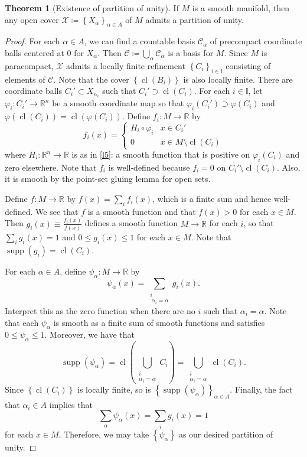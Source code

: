 \documentclass[10pt,letterpaper,cm]{nupset}
\theoremstyle{definition}
\theoremstyle{theorem}
\newtheorem{theorem}[definition]{Theorem}
\theoremstyle{remark}
\newcommand{\R}{\mathbb R}
\newcommand{\1}{\mathbf{1}}
\newcommand{\0}{\vec 0}
\DeclareMathOperator{\supp}{supp}
\DeclareMathOperator{\cl}{cl}
\begin{document}
\begin{theorem}[Existence of partition of unity]
If $M$ is a smooth manifold, then any open cover $\mathcal{X}\coloneqq \left\{X_{\alpha}\right\}_{\alpha \in A}$ of $M$ admits a partition of unity. 
\end{theorem}
\begin{proof}
For each $\alpha \in A$, we can find a countable basis $\mathcal{C}_{\alpha}$ of precompact  coordinate balls centered at $0$ for $X_{\alpha}$. Then $\mathcal{C}\coloneqq \bigcup_{\alpha} \mathcal{C}_{\alpha}$ is a basis for $M$. Since $M$ is paracompact, $\mathcal{X}$ admits a locally finite refinement $\left\{C_i\right\}_{i\in \mathbb{I}}$ consisting of elements of $\mathcal{C}$. Note that the cover $\left\{\cl(B_i)\right\}$ is also locally finite. There are coordinate balls $C_i' \subset X_{\alpha_i}$ such that $ C_i'\supset \cl(C_i)$. For each $i\in \mathbb{I}$, let $\varphi_i : C_i' \to \R^n$ be a smooth coordinate map so that $\varphi_i(C_i') \supset \varphi(C_i)$ and $\varphi(\cl(C_i)) = \cl\left(\varphi(C_i)\right)$. Define $f_i: M \to \R$ by $$f_i(x) = \begin{cases}  H_i \circ \varphi_i &   x\in C_i' \\ 0 & x \in M \setminus \cl(C_i)    \end{cases}      $$ where $H_i: \R^n \to \R$ is as in \cref{l5}: a smooth function that is positive on $\varphi_i(C_i)$ and zero elsewhere. Note that $f_i$ is well-defined because $f_i=0$ on $C_i' \setminus \cl(C_i)$. Also, it is smooth by the point-set gluing lemma for open sets. 

\medskip


Define $f: M \to \R$ by $f(x) = \sum_{i}f_i(x)$, which is a finite sum and hence well-defined. We see that $f$ is a smooth function and that $f(x) >0$ for each $x\in M$. Then $g_i(x) \equiv \frac{f_i(x)}{f(x)}$ defines a smooth function $M \to \R$ for each $i$, so that $\sum_i g_i(x) = 1$ and $0\leq g_i(x) \leq 1$ for each $x\in M$. Note that $\supp(g_i) = \cl(C_i)$. 

\medskip


For each $\alpha \in A$, define $\psi_{\alpha} : M \to \R$ by $$\psi_{\alpha}(x) = \sum_{\substack{i \\ \ \alpha_i=\alpha}}g_i(x)     .$$ Interpret this as the zero function when there are no $i$ such that $\alpha_i = \alpha$.  Note that each $\psi_{\alpha}$ is smooth as a finite sum of smooth functions and satisfies $0\leq  \psi_{\alpha} \leq 1$. Moreover, we have that $$\supp(\psi_{\alpha}) = \cl \left(\bigcup_{\substack{i \\ \alpha_i=\alpha}} C_i \right)= \bigcup_{\substack{i \\ \alpha_i=\alpha}} \cl(C_i). $$ Since $\left\{\cl(C_i)\right\}$ is locally finite, so is $\left\{\supp(\psi_{\alpha})\right\}_{\alpha \in A}$. Finally, the fact that $\alpha_i \in A$ implies that $$\sum_{\alpha} \psi_{\alpha}(x) = \sum_i g_i(x) =1$$ for each $x\in M$. Therefore, we may take $\left\{\psi_{\alpha}\right\}$ as our desired partition of unity. 
\end{proof}
\end{document}
